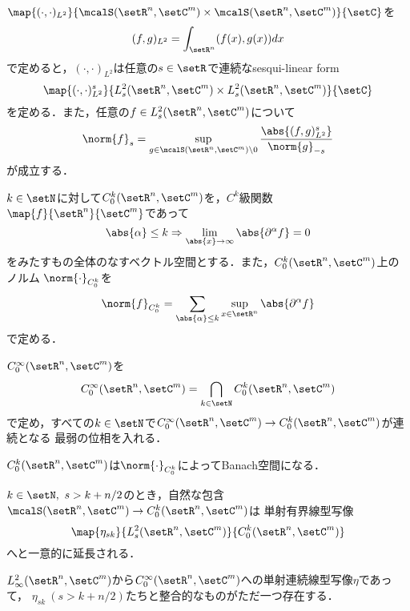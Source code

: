 \documentclass[uplatex,dvipdfmx]{jsarticle}
\newcommand{\sobolev}[1]{L^{2}_{#1}}
\newcommand{\sobolevlocal}[3]{\sobolev{#1}(\setR^{#2},\setC^{#3})}
\newcommand{\schwartz}[2]{\mcalS(\setR^{#1},\setC^{#2})}
\newcommand{\dd}{d} %
\begin{document}
\begin{proposition}
  $\map{(\cdot,\cdot)_{L^2}}{\schwartz{n}{m}\times\schwartz{n}{m}}{\setC}$を
  \[(f,g)_{L^2} = \int_{\setR^n} (f(x),g(x)) \dd x \]
  で定めると，$(\cdot,\cdot)_{L^2}$は任意の$s\in \setR$で連続なsesqui-linear form
  \[ \map{(\cdot,\cdot)^s_{L^2}}{\sobolevlocal{s}{n}{m}\times\sobolevlocal{s}{n}{m}}{\setC} \]
  を定める．また，任意の$f\in \sobolevlocal{s}{n}{m}$について
  \[ \norm{f}_s = \sup_{g\in \schwartz{n}{m}\setminus 0} \frac{\abs{(f,g)_{L^2}^s}}{\norm{g}_{-s}} \]
  が成立する．
\end{proposition}

\begin{definition}
  \begin{enumarabicp}
    \item $k\in \setN$に対して$C^k_0(\setR^n,\setC^m)$を，$C^k$級関数$\map{f}{\setR^n}{\setC^m}$であって
    \[ \abs{\alpha}\leq k \Rightarrow \lim_{\abs{x}\to \infty} \abs{\partial^\alpha f} = 0 \]
    をみたすもの全体のなすベクトル空間とする．また，$C^k_0(\setR^n,\setC^m)$上のノルム
    $\norm{\cdot}_{C^k_0}$を
    \[ \norm{f}_{C^k_0} = \sum_{\abs{\alpha}\leq k} \sup_{x\in \setR^n} \abs{\partial^\alpha f} \]
    で定める．
    \item $C^\infty_0(\setR^n,\setC^m)$を
    \[C^\infty_0(\setR^n,\setC^m) = \bigcap_{k\in \setN} C^k_0(\setR^n,\setC^m) \]
    で定め，すべての$k\in \setN$で$C^\infty_0(\setR^n,\setC^m)\to C^k_0(\setR^n,\setC^m)$が連続となる
    最弱の位相を入れる．
  \end{enumarabicp}
\end{definition}

\begin{proposition}
  $C^k_0(\setR^n,\setC^m)$は$\norm{\cdot}_{C^k_0}$によってBanach空間になる．
\end{proposition}

\begin{theorem}[Sobolevの埋め込み定理]\label{Sobolev embedding}
  $k\in \setN,\ s>k+n/2$のとき，自然な包含$\schwartz{n}{m}\to C^k_0(\setR^n,\setC^m)$は
  単射有界線型写像
  \[ \map{\eta_{sk}}{\sobolevlocal{s}{n}{m}}{C^k_0(\setR^n,\setC^m)}\]
  へと一意的に延長される．
\end{theorem}

\begin{corollary}
  $\sobolevlocal{\infty}{n}{m}$から$C^\infty_0(\setR^n,\setC^m)$への単射連続線型写像$\eta$であって，
  $\eta_{sk}\ (s>k+n/2)$たちと整合的なものがただ一つ存在する．
\end{corollary}
\end{document}
